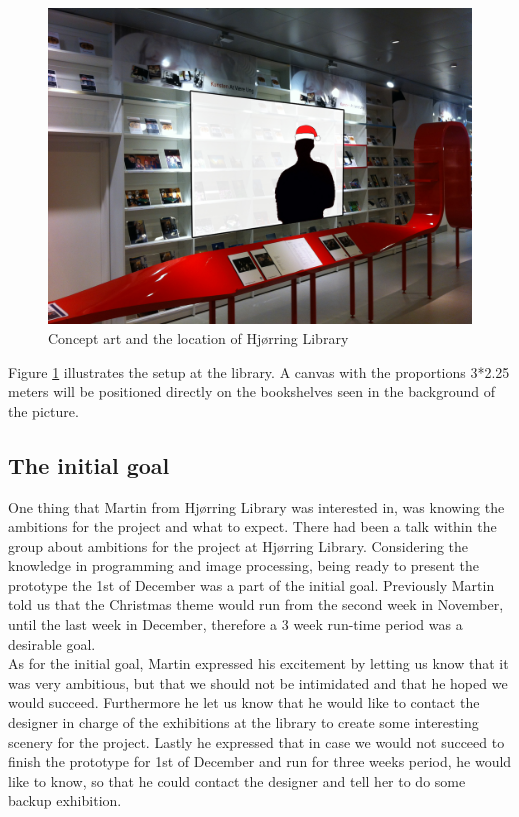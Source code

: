 \begin{figure}[htbp]
\centering
\includegraphics[width=1.00\textwidth]{Pictures/HjoerringLibrary/LocationJohannesHat.jpg}
\caption{Concept art and the location of Hjørring Library}
\label{fig:concept_art}
\end{figure}
Figure \ref{fig:concept_art} illustrates the setup at the library. A canvas with the proportions 3*2.25 meters will be positioned directly on the bookshelves seen in the background of the picture.

\subsection{The initial goal}
One thing that Martin from Hjørring Library was interested in, was knowing the ambitions for the project and what to expect. There had been a talk within the group about ambitions for the project at Hjørring Library. Considering the knowledge in programming and image processing, being ready to present the prototype the 1st of December was a part of the initial goal. Previously Martin told us that the Christmas theme would run from the second week in November, until the last week in December, therefore a 3 week run-time period was a desirable goal.\\
As for the initial goal, Martin expressed his excitement by letting us know that it was very ambitious, but that we should not be intimidated and that he hoped we would succeed. Furthermore he let us know that he would like to contact the designer in charge of the exhibitions at the library to create some interesting scenery for the project. Lastly he expressed that in case we would not succeed to finish the prototype for 1st of December and run for three weeks period, he would like to know, so that he could contact the designer and tell her to do some backup exhibition.

